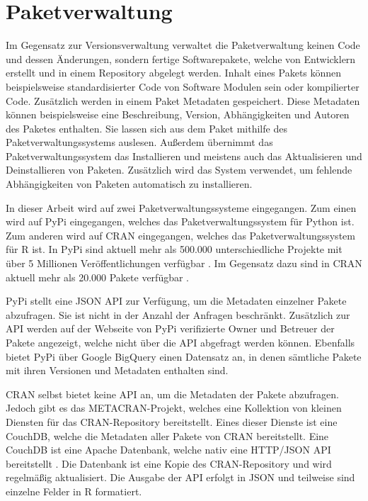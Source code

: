 \section{Paketverwaltung}
\label{sec:paketverwaltung}
Im Gegensatz zur Versionsverwaltung verwaltet die Paketverwaltung keinen Code und dessen Änderungen, sondern fertige Softwarepakete, welche von Entwicklern erstellt und in einem Repository abgelegt werden.
Inhalt eines Pakets können beispielsweise standardisierter Code von Software Modulen sein oder kompilierter Code.
Zusätzlich werden in einem Paket Metadaten gespeichert.
Diese Metadaten können beispielsweise eine Beschreibung, Version, Abhängigkeiten und Autoren des Paketes enthalten.
Sie lassen sich aus dem Paket mithilfe des Paketverwaltungssystems auslesen.
Außerdem übernimmt das Paketverwaltungssystem das Installieren und meistens auch das Aktualisieren und Deinstallieren von Paketen.
Zusätzlich wird das System verwendet, um fehlende Abhängigkeiten von Paketen automatisch zu installieren. \autocite{spinellis_package_2012}

In dieser Arbeit wird auf zwei Paketverwaltungssysteme eingegangen.
Zum einen wird auf PyPi eingegangen, welches das Paketverwaltungssystem für Python ist.
Zum anderen wird auf CRAN eingegangen, welches das Paketverwaltungssystem für R ist.
In PyPi sind aktuell mehr als 500.000 unterschiedliche Projekte mit über 5 Millionen Veröffentlichungen verfügbar \autocite{python_software_foundation_pypi_2024}.
Im Gegensatz dazu sind in CRAN aktuell mehr als 20.000 Pakete verfügbar \autocite{cran_team_comprehensive_2024}.

PyPi stellt eine JSON API zur Verfügung, um die Metadaten einzelner Pakete abzufragen.
Sie ist nicht in der Anzahl der Anfragen beschränkt.
Zusätzlich zur API werden auf der Webseite von PyPi verifizierte Owner und Betreuer der Pakete angezeigt, welche nicht über die API abgefragt werden können.
Ebenfalls bietet PyPi über Google BigQuery einen Datensatz an, in denen sämtliche Pakete mit ihren Versionen und Metadaten enthalten sind. \autocite{python_software_foundation_warehouse_2024}

CRAN selbst bietet keine API an, um die Metadaten der Pakete abzufragen.
Jedoch gibt es das METACRAN-Projekt, welches eine Kollektion von kleinen Diensten für das CRAN-Repository bereitstellt.
Eines dieser Dienste ist eine CouchDB, welche die Metadaten aller Pakete von CRAN bereitstellt.
Eine CouchDB ist eine Apache Datenbank, welche nativ eine HTTP/JSON API bereitstellt \autocite{the_apache_software_foundation_apache_2024}.
Die Datenbank ist eine Kopie des CRAN-Repository und wird regelmäßig aktualisiert.
Die Ausgabe der API erfolgt in JSON und teilweise sind einzelne Felder in R formatiert. \autocite{csardi_pkgsearch_2023}
